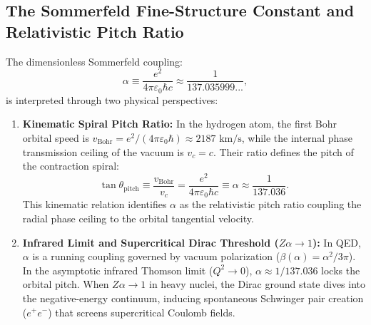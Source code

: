 \subsection{The Sommerfeld Fine-Structure Constant and Relativistic Pitch Ratio}
\label{sec:alpha_main}
The dimensionless Sommerfeld coupling:
\begin{equation}
    \alpha \equiv \frac{e^2}{4\pi \varepsilon_0 \hbar c} \approx \frac{1}{137.035999...},
\end{equation}
is interpreted through two physical perspectives:
\begin{enumerate}
    \item \textbf{Kinematic Spiral Pitch Ratio:} In the hydrogen atom, the first Bohr orbital speed is $v_{\mathrm{Bohr}} = e^2 / (4\pi \varepsilon_0 \hbar) \approx 2187\text{ km/s}$, while the internal phase transmission ceiling of the vacuum is $v_c = c$. Their ratio defines the pitch of the contraction spiral:
          \begin{equation}
              \tan\theta_{\mathrm{pitch}} \equiv \frac{v_{\mathrm{Bohr}}}{v_c} = \frac{e^2}{4\pi \varepsilon_0 \hbar c} \equiv \alpha \approx \frac{1}{137.036}.
          \end{equation}
          This kinematic relation identifies $\alpha$ as the relativistic pitch ratio coupling the radial phase ceiling to the orbital tangential velocity.
    \item \textbf{Infrared Limit and Supercritical Dirac Threshold ($Z\alpha \to 1$):} In QED, $\alpha$ is a running coupling governed by vacuum polarization ($\beta(\alpha) = \alpha^2/3\pi$). In the asymptotic infrared Thomson limit ($Q^2 \to 0$), $\alpha \approx 1/137.036$ locks the orbital pitch. When $Z\alpha \to 1$ in heavy nuclei, the Dirac ground state dives into the negative-energy continuum, inducing spontaneous Schwinger pair creation ($e^+ e^-$) that screens supercritical Coulomb fields.
\end{enumerate}
